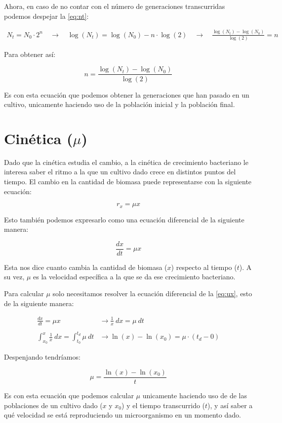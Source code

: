 Ahora, en caso de no contar con el número de generaciones transcurridas podemos despejar la \autoref{eq:nt}:

\begin{align*}
    N_{t} = N_{0} \cdot 2^{n} \quad \longrightarrow \quad \log(N_{t}) = \log(N_{0}) - n \cdot \log(2) \quad \longrightarrow \quad \frac{\log(N_{t}) - \log(N_{0})}{\log(2)} = n
\end{align*}

Para obtener así:

\begin{equation}\label{eq:n}
    n = \frac{\log(N_{t}) - \log(N_{0})}{\log(2)}
\end{equation}

Es con esta ecuación que podemos obtener la generaciones que han pasado en un cultivo, unicamente haciendo uso de la población inicial y la población final.

\section{Cinética ($\mu$)}

Dado que la cinética estudia el cambio, a la cinética de crecimiento bacteriano le interesa saber el ritmo a la que un cultivo dado crece en distintos puntos del tiempo. El cambio en la cantidad de biomasa puede representarse con la siguiente ecuación:

\begin{equation*}
    r_{x} = \mu x
\end{equation*}

Esto también podemos expresarlo como una ecuación diferencial de la siguiente manera:

\begin{equation}\label{eq:ux}
    \frac{dx}{dt} = \mu x
\end{equation}

Esta nos dice cuanto cambia la cantidad de biomasa ($x$) respecto al tiempo ($t$). A su vez, $\mu$ es la velocidad específica a la que se da ese crecimiento bacteriano.

Para calcular $\mu$ solo necesitamos resolver la ecuación diferencial de la \autoref{eq:ux}, esto de la siguiente manera:

\begin{align*}
    \frac{dx}{dt} = \mu x & \longrightarrow \frac{1}{x} \ dx = \mu \ dt
    \\
    \\
    \int_{x_{0}}^{x}{\frac{1}{x}} \ dx = \int_{t_{0}}^{t_{d}}{\mu \ dt} &\longrightarrow \ln(x) - \ln(x_{0}) = \mu \cdot (t_{d} - 0)
\end{align*}

Despenjando tendríamos:

\begin{equation}
    \mu = \frac{\ln(x) - \ln(x_{0})}{t}
\end{equation}

Es con esta ecuación que podemos calcular $\mu$ unicamente haciendo uso de de las poblaciones de un cultivo dado ($x$ y $x_{0}$) y el tiempo transcurrido ($t$), y así saber a qué velocidad se está reproduciendo un microorganismo en un momento dado.